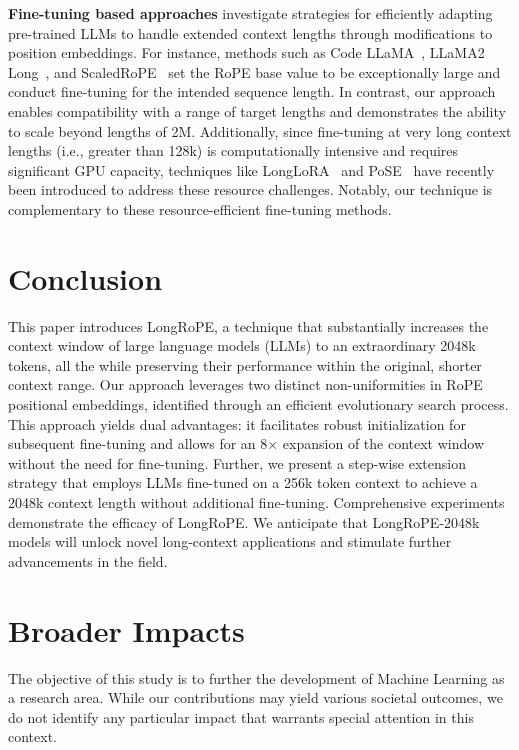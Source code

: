 \textbf{Fine-tuning based approaches} investigate strategies for efficiently adapting pre-trained LLMs to handle extended context lengths through modifications to position embeddings. For instance, methods such as Code LLaMA~\cite{codellama}, LLaMA2 Long~\cite{xiong2023effective}, and ScaledRoPE~\cite{liu2023scaling} set the RoPE base value to be exceptionally large and conduct fine-tuning for the intended sequence length. In contrast, our approach enables compatibility with a range of target lengths and demonstrates the ability to scale beyond lengths of 2M. Additionally, since fine-tuning at very long context lengths (i.e., greater than 128k) is computationally intensive and requires significant GPU capacity, techniques like LongLoRA~\cite{longlora} and PoSE~\cite{zhu2023pose} have recently been introduced to address these resource challenges. Notably, our technique is complementary to these resource-efficient fine-tuning methods.

\section{Conclusion}

This paper introduces LongRoPE, a technique that substantially increases the context window of large language models (LLMs) to an extraordinary 2048k tokens, all the while preserving their performance within the original, shorter context range. Our approach leverages two distinct non-uniformities in RoPE positional embeddings, identified through an efficient evolutionary search process. This approach yields dual advantages: it facilitates robust initialization for subsequent fine-tuning and allows for an 8$\times$ expansion of the context window without the need for fine-tuning. Further, we present a step-wise extension strategy that employs LLMs fine-tuned on a 256k token context to achieve a 2048k context length without additional fine-tuning. Comprehensive experiments demonstrate the efficacy of LongRoPE. We anticipate that LongRoPE-2048k models will unlock novel long-context applications and stimulate further advancements in the field.

\section*{Broader Impacts} The objective of this study is to further the development of Machine Learning as a research area. While our contributions may yield various societal outcomes, we do not identify any particular impact that warrants special attention in this context.

	\balance

